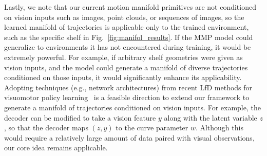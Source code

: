 Lastly, we note that our current motion manifold primitives are not conditioned on vision inputs such as images, point clouds, or sequences of images, so the learned manifold of trajectories is applicable only to the trained environment, such as the specific shelf in Fig.~\ref{fig:manifol_results}. If the MMP model could generalize to environments it has not encountered during training, it would be extremely powerful. For example, if arbitrary shelf geometries were given as vision inputs, and the model could generate a manifold of diverse trajectories conditioned on those inputs, it would significantly enhance its applicability. Adopting techniques (e.g., network architectures) from recent LfD methods for visuomotor policy learning~\cite{chi2023diffusion, lee2024behavior} is a feasible direction to extend our framework to generate a manifold of trajectories conditioned on vision inputs. For example, the decoder can be modified to take a vision feature \(y\) along with the latent variable \(z\), so that the decoder maps \((z, y)\) to the curve parameter \(w\). Although this would require a relatively large amount of data paired with visual observations, our core idea remains applicable.
